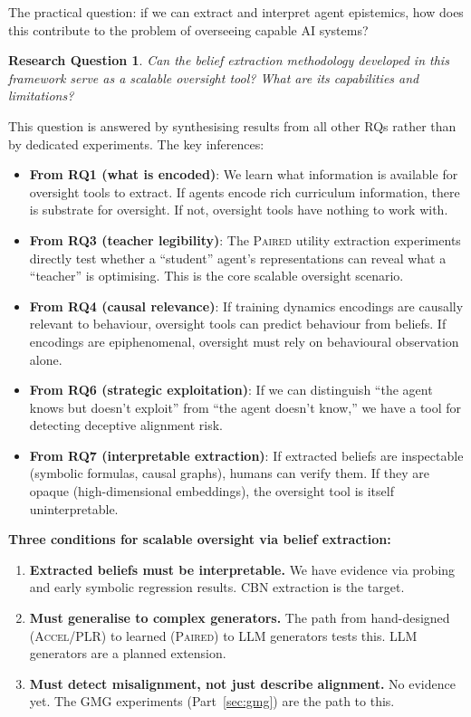 \documentclass[11pt,a4paper]{article}
\newtheorem{researchq}{Research Question}[subsection]
\theoremstyle{remark}
\newcommand{\paired}{\textsc{Paired}}
\newcommand{\accel}{\textsc{Accel}}
\newcommand{\plr}{\textsc{PLR}}
\begin{document}
The practical question: if we can extract and interpret agent epistemics, how does this contribute to the problem of overseeing capable AI systems?

\begin{researchq}
Can the belief extraction methodology developed in this framework serve as a scalable oversight tool? What are its capabilities and limitations?
\end{researchq}

This question is answered by synthesising results from all other RQs rather than by dedicated experiments. The key inferences:

\begin{itemize}
    \item \textbf{From RQ1 (what is encoded)}: We learn what information is available for oversight tools to extract. If agents encode rich curriculum information, there is substrate for oversight. If not, oversight tools have nothing to work with.

    \item \textbf{From RQ3 (teacher legibility)}: The \paired{} utility extraction experiments directly test whether a ``student'' agent's representations can reveal what a ``teacher'' is optimising. This is the core scalable oversight scenario.

    \item \textbf{From RQ4 (causal relevance)}: If training dynamics encodings are causally relevant to behaviour, oversight tools can predict behaviour from beliefs. If encodings are epiphenomenal, oversight must rely on behavioural observation alone.

    \item \textbf{From RQ6 (strategic exploitation)}: If we can distinguish ``the agent knows but doesn't exploit'' from ``the agent doesn't know,'' we have a tool for detecting deceptive alignment risk.

    \item \textbf{From RQ7 (interpretable extraction)}: If extracted beliefs are inspectable (symbolic formulas, causal graphs), humans can verify them. If they are opaque (high-dimensional embeddings), the oversight tool is itself uninterpretable.
\end{itemize}

\textbf{Three conditions for scalable oversight via belief extraction:}
\begin{enumerate}
    \item \textbf{Extracted beliefs must be interpretable.} We have evidence via probing and early symbolic regression results. CBN extraction is the target.
    \item \textbf{Must generalise to complex generators.} The path from hand-designed (\accel{}/\plr{}) to learned (\paired{}) to LLM generators tests this. LLM generators are a planned extension.
    \item \textbf{Must detect misalignment, not just describe alignment.} No evidence yet. The GMG experiments (Part~\ref{sec:gmg}) are the path to this.
\end{enumerate}
\end{document}
